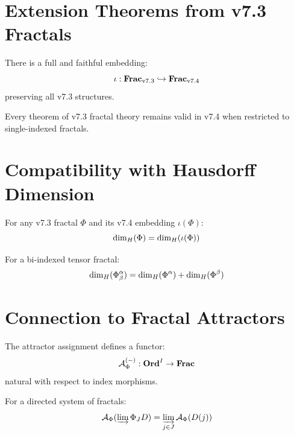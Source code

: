 \section{Extension Theorems from v7.3 Fractals}

\begin{theorem}[v7.3 Embedding]
\label{thm:v73-embedding}
There is a full and faithful embedding:
\[
    \iota: \mathbf{Frac}_{\mathrm{v7.3}} \hookrightarrow \mathbf{Frac}_{\mathrm{v7.4}}
\]
preserving all v7.3 structures.
\end{theorem}

\begin{corollary}
\label{cor:backward-compat}
Every theorem of v7.3 fractal theory remains valid in v7.4 when restricted
to single-indexed fractals.
\end{corollary}

\section{Compatibility with Hausdorff Dimension}

\begin{theorem}
\label{thm:dim-consistency}
For any v7.3 fractal $\Phi$ and its v7.4 embedding $\iota(\Phi)$:
\[
    \dim_H(\Phi) = \dim_H(\iota(\Phi))
\]
\end{theorem}

\begin{theorem}
\label{thm:multi-dim-formula}
For a bi-indexed tensor fractal:
\[
    \dim_H(\Phi^{\alpha}_{\beta}) = \dim_H(\Phi^{\alpha})
    + \dim_H(\Phi^{\beta})
\]
\end{theorem}

\section{Connection to Fractal Attractors}

\begin{theorem}
\label{thm:attractor-functor}
The attractor assignment defines a functor:
\[
    \mathcal{A}_\Phi^{(-)}: \mathbf{Ord}^I \to \mathbf{Frac}
\]
natural with respect to index morphisms.
\end{theorem}

\begin{theorem}
\label{thm:colimit-attractor}
For a directed system of fractals:
\[
    \mathcal{A}_\Phi(\varinjlim\Phi_J D) = \varinjlim_{j \in J} \mathcal{A}_\Phi(D(j))
\]
\end{theorem}


